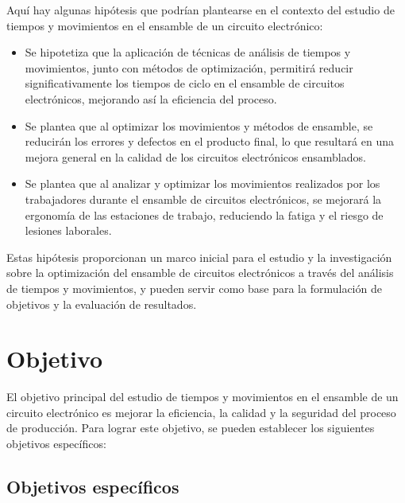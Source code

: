     Aquí hay algunas hipótesis que podrían plantearse en el contexto del estudio de tiempos y movimientos en el ensamble de un circuito electrónico:
    \begin{itemize}
        \item  Se hipotetiza que la aplicación de técnicas de análisis de tiempos y movimientos, junto con métodos de optimización, permitirá reducir significativamente los tiempos de ciclo en el ensamble de circuitos electrónicos, mejorando así la eficiencia del proceso.
        \item Se plantea que al optimizar los movimientos y métodos de ensamble, se reducirán los errores y defectos en el producto final, lo que resultará en una mejora general en la calidad de los circuitos electrónicos ensamblados.
        \item Se plantea que al analizar y optimizar los movimientos realizados por los trabajadores durante el ensamble de circuitos electrónicos, se mejorará la ergonomía de las estaciones de trabajo, reduciendo la fatiga y el riesgo de lesiones laborales.
    \end{itemize}
    Estas hipótesis proporcionan un marco inicial para el estudio y la investigación sobre la optimización del ensamble de circuitos electrónicos a través del análisis de tiempos y movimientos, y pueden servir como base para la formulación de objetivos y la evaluación de resultados.
    \section{Objetivo}
        El objetivo principal del estudio de tiempos y movimientos en el ensamble de un circuito electrónico es mejorar la eficiencia, la calidad y la seguridad del proceso de producción. Para lograr este objetivo, se pueden establecer los siguientes objetivos específicos:

    \subsection{Objetivos específicos }

